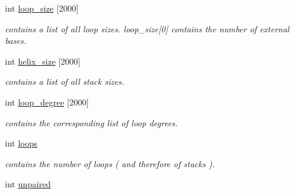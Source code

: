 \begin{DoxyCompactItemize}
\item 
\mbox{\label{group__struct__utils__deprecated_ga365a3fad38b21ca8606cb556f2896218}} 
int \mbox{\hyperlink{group__struct__utils__deprecated_ga365a3fad38b21ca8606cb556f2896218}{loop\+\_\+size}} \mbox{[}2000\mbox{]}
\begin{DoxyCompactList}\small\item\em contains a list of all loop sizes. loop\+\_\+size\mbox{[}0\mbox{]} contains the number of external bases. \end{DoxyCompactList}\item 
\mbox{\label{group__struct__utils__deprecated_ga3fce53616c021cbc724fc80b8c1ebeb5}} 
int \mbox{\hyperlink{group__struct__utils__deprecated_ga3fce53616c021cbc724fc80b8c1ebeb5}{helix\+\_\+size}} \mbox{[}2000\mbox{]}
\begin{DoxyCompactList}\small\item\em contains a list of all stack sizes. \end{DoxyCompactList}\item 
\mbox{\label{group__struct__utils__deprecated_ga0518a287aa4a870508cea819029778ab}} 
int \mbox{\hyperlink{group__struct__utils__deprecated_ga0518a287aa4a870508cea819029778ab}{loop\+\_\+degree}} \mbox{[}2000\mbox{]}
\begin{DoxyCompactList}\small\item\em contains the corresponding list of loop degrees. \end{DoxyCompactList}\item 
\mbox{\label{group__struct__utils__deprecated_ga439fcb9f8d4f9f4d2227fde5fbfecb30}} 
int \mbox{\hyperlink{group__struct__utils__deprecated_ga439fcb9f8d4f9f4d2227fde5fbfecb30}{loops}}
\begin{DoxyCompactList}\small\item\em contains the number of loops ( and therefore of stacks ). \end{DoxyCompactList}\item 
\mbox{\label{group__struct__utils__deprecated_gadd2f952597e02d66e1116a9d11d252d6}} 
int \mbox{\hyperlink{group__struct__utils__deprecated_gadd2f952597e02d66e1116a9d11d252d6}{unpaired}}

\end{DoxyCompactItemize}
